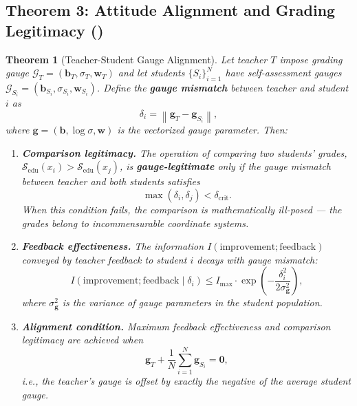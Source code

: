 \documentclass[11pt,a4paper]{article}
\newtheorem{theorem}{Theorem}[section]
\newcommand{\cS}{\mathcal{S}}
\newcommand{\cG}{\mathcal{G}}
\newcommand{\norm}[1]{\left\lVert#1\right\rVert}
\begin{document}
\subsection{Theorem 3: Attitude Alignment and Grading Legitimacy ()}
\begin{theorem}[Teacher-Student Gauge Alignment]
\label{thm:attitude_alignment}
Let teacher $T$ impose grading gauge $\cG_T = (\mathbf{b}_T, \sigma_T, \mathbf{w}_T)$ and let students $\{S_i\}_{i=1}^N$ have self-assessment gauges $\cG_{S_i} = (\mathbf{b}_{S_i}, \sigma_{S_i}, \mathbf{w}_{S_i})$. Define the \textbf{gauge mismatch} between teacher and student $i$ as
\begin{equation}
    \delta_i = \norm{\mathbf{g}_T - \mathbf{g}_{S_i}},
\end{equation}
where $\mathbf{g} = (\mathbf{b}, \log\sigma, \mathbf{w})$ is the vectorized gauge parameter. Then:
\begin{enumerate}[label=(\roman*)]
    \item \textbf{Comparison legitimacy.} The operation of comparing two students' grades, $\cS_{\text{edu}}(x_i) > \cS_{\text{edu}}(x_j)$, is \textbf{gauge-legitimate} only if the gauge mismatch between teacher and both students satisfies
    \begin{equation}
        \max(\delta_i, \delta_j) < \delta_{\text{crit}}.
    \end{equation}
    When this condition fails, the comparison is mathematically ill-posed — the grades belong to incommensurable coordinate systems.
    \item \textbf{Feedback effectiveness.} The information $I(\text{improvement}; \text{feedback})$ conveyed by teacher feedback to student $i$ decays with gauge mismatch:
    \begin{equation}
        I(\text{improvement}; \text{feedback} \mid \delta_i) \leq I_{\max} \cdot \exp\left(-\frac{\delta_i^2}{2\sigma_{\mathbf{g}}^2}\right),
    \end{equation}
    where $\sigma_{\mathbf{g}}^2$ is the variance of gauge parameters in the student population.
    \item \textbf{Alignment condition.} Maximum feedback effectiveness and comparison legitimacy are achieved when
    \begin{equation}
        \mathbf{g}_T + \frac{1}{N}\sum_{i=1}^N \mathbf{g}_{S_i} = \mathbf{0},
    \end{equation}
    i.e., the teacher's gauge is offset by exactly the negative of the average student gauge.
\end{enumerate}
\end{theorem}
\end{document}

